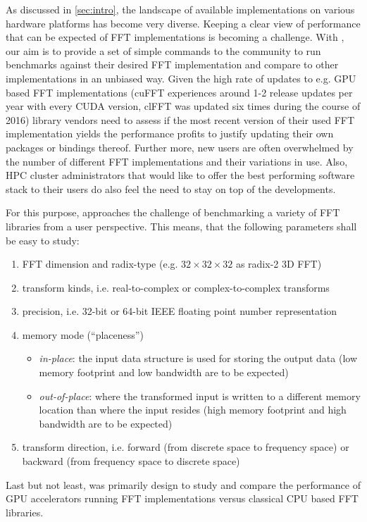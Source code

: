 As discussed in \cref{sec:intro}, the landscape of available implementations on various hardware platforms has become very diverse. Keeping a clear view of performance that can be expected of FFT implementations is becoming a challenge. 
With \gearshifft{}, our aim is to provide a set of simple commands to the community to run benchmarks against their desired FFT implementation and compare to other implementations in an unbiased way. Given the high rate of updates to e.g. GPU based FFT implementations (cuFFT experiences around 1-2 release updates per year with every CUDA version, clFFT was updated six times during the course of 2016) library vendors need to assess if the most recent version of their used FFT implementation yields the performance profits to justify updating their own packages or bindings thereof. Further more, new users are often overwhelmed by the number of different FFT implementations and their variations in use. Also, HPC cluster administrators that would like to offer the best performing software stack to their users do also feel the need to stay on top of the developments. 

For this purpose, \gearshifft{} approaches the challenge of benchmarking a variety of FFT libraries from a user perspective. This means, that the following parameters shall be easy to study:

\begin{enumerate}
\item FFT dimension and radix-type (e.g. $32{\times}32{\times}32$ as radix-2 3D FFT)
\item transform kinds, i.e. real-to-complex or complex-to-complex transforms
\item precision, i.e. 32-bit or 64-bit IEEE floating point number representation
\item memory mode (``placeness'')
  \begin{itemize}
  \item \emph{in-place}: the input data structure is used for storing the output data (low memory footprint and low bandwidth are to be expected)
  \item \emph{out-of-place}:  where the transformed input is written to a different memory location than where the input resides (high memory footprint and high bandwidth are to be expected)
  \end{itemize}
\item transform direction, i.e. forward (from discrete space to frequency space) or backward (from frequency space to discrete space)
\end{enumerate}
 
Last but not least, \gearshifft{} was primarily design to study and compare the performance of GPU accelerators running FFT implementations versus classical CPU based FFT libraries.   
